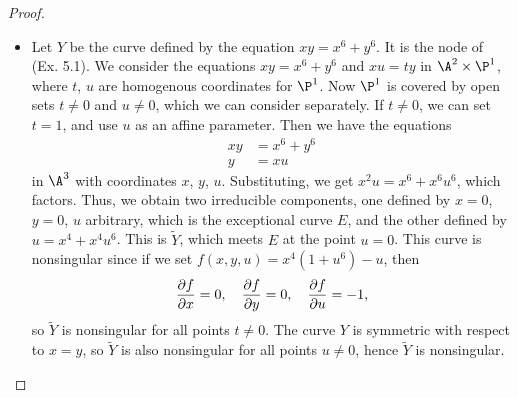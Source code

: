 \documentclass[a4paper]{article}
\begin{document}
\begin{enumerate} [label=\textbf{\arabic*.}, leftmargin=0cm]
          \begin{proof} $ $ \vspace{0pt}
              \begin{itemize} [leftmargin=0cm]
                  \item[(a)] Let $Y$ be the curve defined by the equation $xy = x^6 + y^6$. It is the node of (Ex. 5.1).
                  We consider the equations $xy = x^6 + y^6$ and $xu = ty$ in $\A^2 \times \P^1$, where $t$, $u$ are homogenous coordinates for $\P^1$.
                  Now $\P^1$ is covered by open sets $t \neq 0$ and $u \neq 0$, which we can consider separately.
                If $t \neq 0$, we can set $t = 1$, and use $u$ as an affine parameter. Then we have the equations
                        \begin{align*}
                            xy & = x^6 + y^6 \\
                            y  & = xu
                        \end{align*}
                        in $\A^3$ with coordinates $x$, $y$, $u$. Substituting, we get $x^2 u = x^6 + x^6 u^6$, which factors. Thus, we obtain two irreducible components, one defined by $x = 0$, $y = 0$, $u$ arbitrary, which is the exceptional curve $E$, and the other defined by $u = x^4 + x^4 u^6$. This is $\widetilde{Y}$, which meets $E$ at the point $u = 0$. This curve is nonsingular since if we set $f(x, y, u) = x^4(1 + u^6) - u$, then
                        \begin{equation*}
                            \pdv{f}{x}(O) = 0, \quad \pdv{f}{y}(O) = 0, \quad \pdv{f}{u}(O) = -1,
                        \end{equation*}
                        so $\widetilde{Y}$ is nonsingular for all points $t \neq 0$. The curve $Y$ is symmetric with respect to $x = y$, so $\widetilde{Y}$ is also nonsingular for all points $u \neq 0$, hence $\widetilde{Y}$ is nonsingular.


\end{itemize}
\end{proof}
\end{enumerate}
\end{document}
